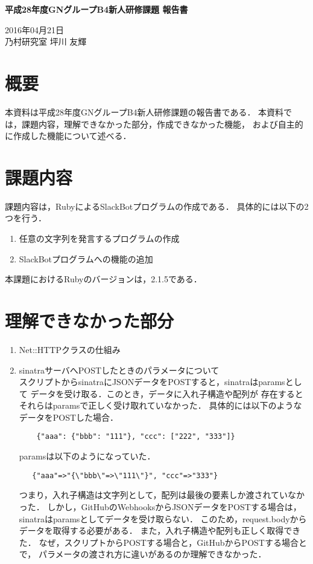 \documentclass[fleqn, 14pt]{sty/extarticlej}
\begin{document}
\begin{center}
{\Large {\bf 平成28年度GNグループB4新人研修課題 報告書}}

\end{center}
\begin{flushright}
2016年04月21日\\

乃村研究室 坪川 友輝
\end{flushright}
\section{概要}
本資料は平成28年度GNグループB4新人研修課題の報告書である．
本資料では，課題内容，理解できなかった部分，作成できなかった機能，
および自主的に作成した機能について述べる．

\section{課題内容}
課題内容は，RubyによるSlackBotプログラムの作成である．
具体的には以下の2つを行う．
\begin{enumerate}
\item 任意の文字列を発言するプログラムの作成
\item SlackBotプログラムへの機能の追加
\end{enumerate}

本課題におけるRubyのバージョンは，2.1.5である．

\section{理解できなかった部分}
\begin{enumerate}
\item Net::HTTPクラスの仕組み
\item sinatraサーバへPOSTしたときのパラメータについて\\
  スクリプトからsinatraにJSONデータをPOSTすると，sinatraはparamsとして
  データを受け取る．このとき，データに入れ子構造や配列が
  存在するとそれらはparamsで正しく受け取れていなかった．
  具体的には以下のようなデータをPOSTした場合．
\begin{verbatim}
    {"aaa": {"bbb": "111"}, "ccc": ["222", "333"]}
\end{verbatim}
  paramsは以下のようになっていた．
\begin{verbatim}
   {"aaa"=>"{\"bbb\"=>\"111\"}", "ccc"=>"333"}
\end{verbatim}
  つまり，入れ子構造は文字列として，配列は最後の要素しか渡されていなかった．
  しかし，GitHubのWebhooksからJSONデータをPOSTする場合は，
  sinatraはparamsとしてデータを受け取らない．
  このため，request.bodyからデータを取得する必要がある．
  また，入れ子構造や配列も正しく取得できた．
  なぜ，スクリプトからPOSTする場合と，GitHubからPOSTする場合とで，
  パラメータの渡され方に違いがあるのか理解できなかった．
\end{enumerate}
\end{document}
